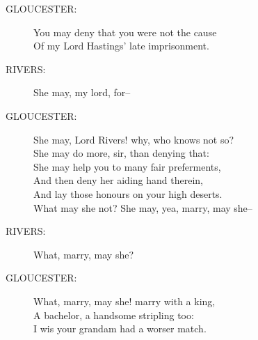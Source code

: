 \documentclass{article}
\begin{document}
\begin{description}
\item[GLOUCESTER:] 
\hspace{1pt}You may deny that you were not the cause\\
\hspace{1pt}Of my Lord Hastings' late imprisonment.\\
\end{description}
\begin{description}
\item[RIVERS:] 
\hspace{1pt}She may, my lord, for--\\
\end{description}
\begin{description}
\item[GLOUCESTER:] 
\hspace{1pt}She may, Lord Rivers! why, who knows not so?\\
\hspace{1pt}She may do more, sir, than denying that:\\
\hspace{1pt}She may help you to many fair preferments,\\
\hspace{1pt}And then deny her aiding hand therein,\\
\hspace{1pt}And lay those honours on your high deserts.\\
\hspace{1pt}What may she not? She may, yea, marry, may she--\\
\end{description}
\begin{description}
\item[RIVERS:] 
\hspace{1pt}What, marry, may she?\\
\end{description}
\begin{description}
\item[GLOUCESTER:] 
\hspace{1pt}What, marry, may she! marry with a king,\\
\hspace{1pt}A bachelor, a handsome stripling too:\\
\hspace{1pt}I wis your grandam had a worser match.\\
\end{description}
\end{document}
